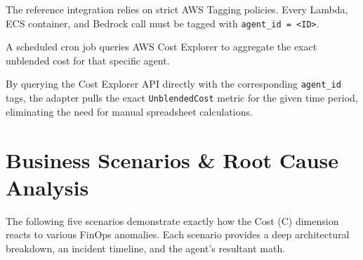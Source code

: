 \documentclass[11pt,a4paper]{article}
\begin{document}
The reference integration relies on strict AWS Tagging policies. Every Lambda, ECS container, and Bedrock call must be tagged with \texttt{agent\_id = <ID>}. 

A scheduled cron job queries AWS Cost Explorer to aggregate the exact unblended cost for that specific agent.

\vspace{0.5cm}
\begin{center}
\end{center}
\vspace{0.5cm}

By querying the Cost Explorer API directly with the corresponding \texttt{agent\_id} tags, the adapter pulls the exact \texttt{UnblendedCost} metric for the given time period, eliminating the need for manual spreadsheet calculations.

\newpage

\section{Business Scenarios \& Root Cause Analysis}

The following five scenarios demonstrate exactly how the Cost (C) dimension reacts to various FinOps anomalies. Each scenario provides a deep architectural breakdown, an incident timeline, and the agent's resultant math.
\end{document}
